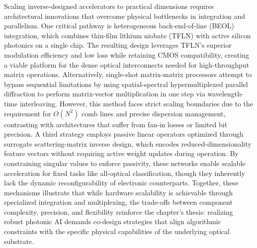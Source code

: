 \documentclass[11pt]{article}
\begin{document}
Scaling inverse-designed accelerators to practical dimensions requires architectural innovations that overcome physical bottlenecks in integration and parallelism. One critical pathway is heterogeneous back-end-of-line (BEOL) integration, which combines thin-film lithium niobate (TFLN) with active silicon photonics on a single chip. \citep{s2_9b444e84d20ae6e3d62d2d4df30268b5a53baad2_40af2cc9} The resulting design leverages TFLN's superior modulation efficiency and low loss while retaining CMOS compatibility, creating a viable platform for the dense optical interconnects needed for high-throughput matrix operations. Alternatively, single-shot matrix-matrix processors attempt to bypass sequential limitations by using spatial-spectral hypermultiplexed parallel diffraction to perform matrix-vector multiplication in one step via wavelength-time interleaving. \citep{doi_10_1038_s41467_026_68452_x_bafa2de0} However, this method faces strict scaling boundaries due to the requirement for \(O(N^{2})\) comb lines and precise dispersion management, contrasting with architectures that suffer from fan-in losses or limited bit precision. A third strategy employs passive linear operators optimized through surrogate scattering-matrix inverse design, which encodes reduced-dimensionality feature vectors without requiring active weight updates during operation. By constraining singular values to enforce passivity, these networks enable scalable acceleration for fixed tasks like all-optical classification, though they inherently lack the dynamic reconfigurability of electronic counterparts. Together, these mechanisms illustrate that while hardware scalability is achievable through specialized integration and multiplexing, the trade-offs between component complexity, precision, and flexibility reinforce the chapter's thesis: realizing robust photonic AI demands co-design strategies that align algorithmic constraints with the specific physical capabilities of the underlying optical substrate. \citep{s2_9b444e84d20ae6e3d62d2d4df30268b5a53baad2_40af2cc9} \citep{doi_10_1038_s41467_026_68452_x_bafa2de0} \citep{s2_753a5d83a96e0194da93bcb6f20fa0bd356e37fa_c11e3796}
\end{document}
